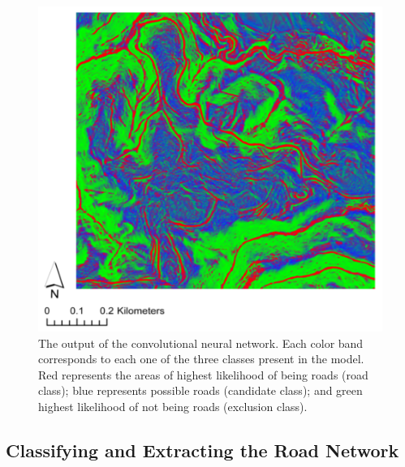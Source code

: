 \documentclass[remotesensing,article,accept,pdftex,moreauthors]{Definitions/mdpi}
\begin{document}
\begin{figure}[H]
\includegraphics[width=12 cm]{cnn.png}
\caption{The output of the convolutional neural network. Each color band corresponds to each one of the three classes present in the model. Red represents the areas of highest likelihood of being roads (road class); blue represents possible roads (candidate class); and green highest likelihood of not being roads (exclusion class). \label{fig5}}
\end{figure}  

\subsection{Classifying and Extracting the Road Network}
\end{document}
